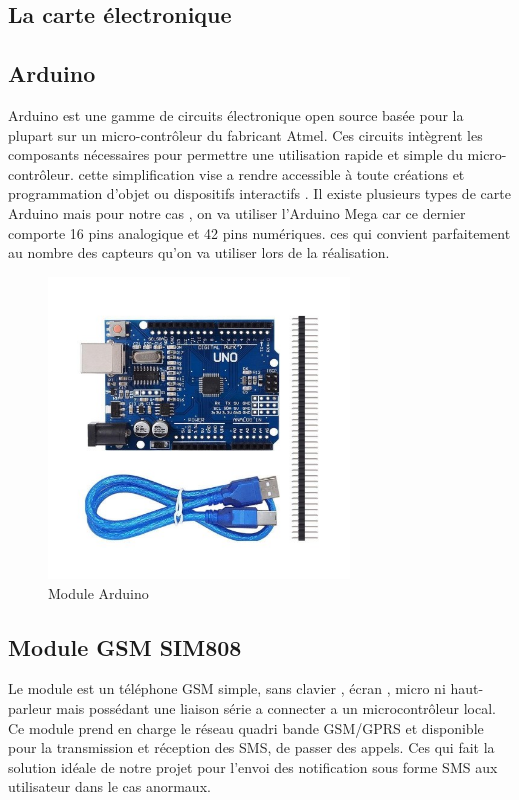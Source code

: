 \subsection*{La carte électronique}
\subsection*{Arduino}
Arduino est une gamme de circuits électronique open source basée pour la plupart sur un micro-contrôleur du fabricant Atmel. Ces circuits intègrent les composants nécessaires pour permettre une utilisation rapide et simple du micro-contrôleur. cette simplification vise a rendre accessible à toute créations et programmation d'objet ou dispositifs interactifs . Il existe plusieurs types de carte Arduino mais pour notre cas , on va utiliser l'Arduino Mega car ce dernier comporte 16 pins analogique et 42 pins numériques. ces qui convient parfaitement au nombre des capteurs qu'on va utiliser lors de la réalisation.

\begin{figure}[H]
	\centering
	\includegraphics[width=8cm]{./img/arduinoAtmega.jpg}
	\caption{Module Arduino }
	\label{i1}
\end{figure}

\subsection*{Module GSM SIM808}

Le module est un téléphone GSM simple, sans clavier , écran , micro ni haut-parleur mais possédant une liaison série a connecter a un microcontrôleur local. Ce module prend en charge le réseau quadri bande GSM/GPRS et disponible pour la transmission et réception des SMS, de passer des appels. Ces qui fait la solution idéale de notre projet pour l'envoi des notification sous forme SMS aux utilisateur dans le cas anormaux.\\

